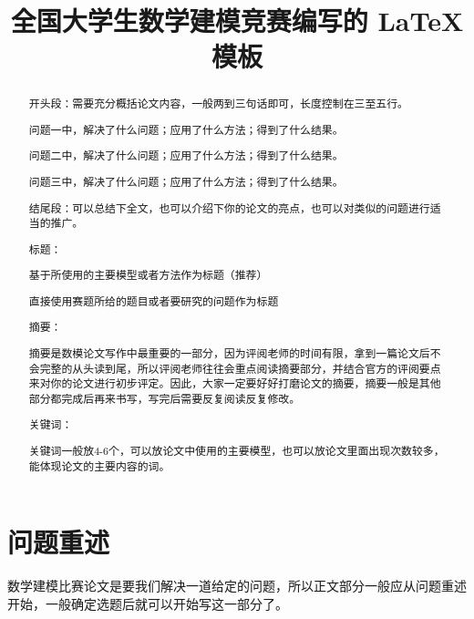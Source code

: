 \documentclass[withoutpreface,bwprint]{cumcmthesis} %
\title{全国大学生数学建模竞赛编写的 \LaTeX{} 模板}
\begin{document}
\maketitle
\begin{abstract}

开头段：需要充分概括论文内容，一般两到三句话即可，长度控制在三至五行。

问题一中，解决了什么问题；应用了什么方法；得到了什么结果。

问题二中，解决了什么问题；应用了什么方法；得到了什么结果。

问题三中，解决了什么问题；应用了什么方法；得到了什么结果。

结尾段：可以总结下全文，也可以介绍下你的论文的亮点，也可以对类似的问题进行适当的推广。

\begin{mdframed} [%
	roundcorner=5pt,
	linecolor=gray!50,
	outerlinewidth=0.5pt,
	middlelinewidth=0.3pt, backgroundcolor=gray!2,
innertopmargin=\topskip, frametitle={首页三要素: 论文标题 + 摘要 + 关键词},
frametitlefont= \bfseries,frametitlerule=true,frametitlealignment =\raggedright\noindent,
frametitlerulewidth=.5pt, frametitlebackgroundcolor=gray!2,]

标题：

基于所使用的主要模型或者方法作为标题（推荐）

直接使用赛题所给的题目或者要研究的问题作为标题

摘要：

摘要是数模论文写作中最重要的一部分，因为评阅老师的时间有限，拿到一篇论文后不会完整的从头读到尾，所以评阅老师往往会重点阅读摘要部分，并结合官方的评阅要点来对你的论文进行初步评定。因此，大家一定要好好打磨论文的摘要，摘要一般是其他部分都完成后再来书写，写完后需要反复阅读反复修改。

关键词：

关键词一般放4-6个，可以放论文中使用的主要模型，也可以放论文里面出现次数较多，能体现论文的主要内容的词。

\end{mdframed}

\end{abstract}

\section{问题重述}

数学建模比赛论文是要我们解决一道给定的问题，所以正文部分一般应从问题重述开始，一般确定选题后就可以开始写这一部分了。
\end{document}
